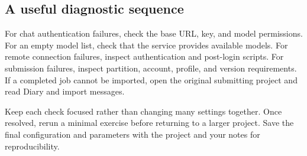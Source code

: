 \subsection{A useful diagnostic sequence}

For chat authentication failures, check the base URL, key, and model permissions. For an empty model list, check that the service provides available models. For remote connection failures, inspect authentication and post-login scripts. For submission failures, inspect partition, account, profile, and version requirements. If a completed job cannot be imported, open the original submitting project and read Diary and import messages.

Keep each check focused rather than changing many settings together. Once resolved, rerun a minimal exercise before returning to a larger project. Save the final configuration and parameters with the project and your notes for reproducibility.
